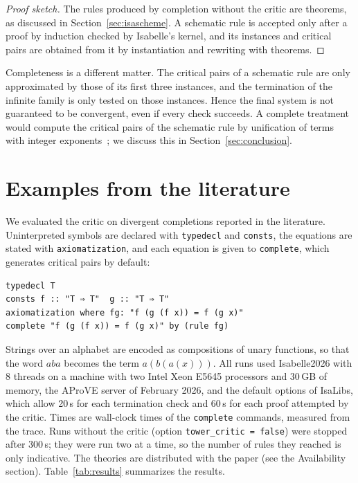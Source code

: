 \documentclass[preprint,12pt]{elsarticle}
\newcommand{\isa}[1]{\texttt{#1}}
\begin{document}
\begin{proof}[Proof sketch]
The rules produced by completion without the critic are theorems, as
discussed in Section~\ref{sec:isascheme}. A schematic rule is accepted only
after a proof by induction checked by Isabelle's kernel, and its instances
and critical pairs are obtained from it by instantiation and rewriting with
theorems.
\end{proof}

Completeness is a different matter. The critical pairs of a schematic rule
are only approximated by those of its first three instances, and the
termination of the infinite family is only tested on those instances.
Hence the final system is not guaranteed to be convergent, even if every
check succeeds. A complete treatment would compute the critical pairs of
the schematic rule by unification of terms with integer
exponents~\cite{Comon95}; we discuss this in Section~\ref{sec:conclusion}.

\section{Examples from the literature}
\label{sec:examples}

We evaluated the critic on divergent completions reported in the
literature. Uninterpreted symbols are declared with \isa{typedecl} and
\isa{consts}, the equations are stated with \isa{axiomatization}, and each
equation is given to \isa{complete}, which generates critical pairs by
default:
\begin{lstlisting}
typedecl T
consts f :: "T ⇒ T"  g :: "T ⇒ T"
axiomatization where fg: "f (g (f x)) = f (g x)"
complete "f (g (f x)) = f (g x)" by (rule fg)
\end{lstlisting}
Strings over an alphabet are encoded as compositions of unary functions,
so that the word $aba$ becomes the term $a(b(a(x)))$. All runs used
Isabelle2026 with 8 threads on a machine with two Intel Xeon E5645
processors and 30\,GB of memory, the AProVE server of February 2026, and
the default options of IsaLibs, which allow 20\,s for each termination
check and 60\,s for each proof attempted by the critic. Times are wall-clock times of the
\isa{complete} commands, measured from the trace. Runs without the critic
(option \isa{tower\_critic = false}) were stopped after 300\,s; they
were run two at a time, so the number of rules they reached is only
indicative. The theories are distributed with the paper (see the
Availability section).
Table~\ref{tab:results} summarizes the results.
\end{document}
